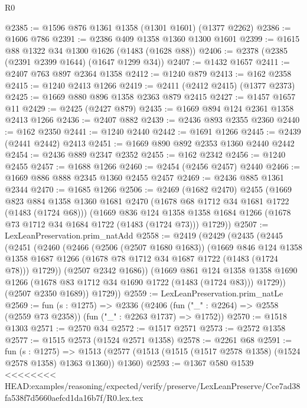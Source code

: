 \begin{lexlean}{R0}
\begin{coremodule}
{{{{{{{{{{{{{{{{{{{{{{{{{{{{{{{{{{{{{{{{{{{{{{{{{{{{{{{{{{{{{{{{{{{{{{{{{{{{{{{{{{{{{{@2385 := @1596 @876 @1361 @1358 (@1301 @1601) (@1377 @2262)
@2386 := @1606 @786
@2391 := @2386 @409 @1358 @1360 @1300 @1601
@2399 := @1615 @88 @1322 @34 @1300 @1626 (@1483 (@1628 @88))
@2406 := @2378 (@2385 (@2391 @2399 @1644) (@1647 @1299 @34))
@2407 := @1432 @1657
@2411 := @2407 @763 @897 @2364 @1358
@2412 := @1240 @879
@2413 := @162 @2358
@2415 := @1240 @2413 @1266
@2419 := @2411 (@2412 @2415) (@1377 @2373)
@2425 := @1669 @880 @896 @1358 @2363 @879 @2415
@2427 := @1457 @1657 @11
@2429 := @2425 (@2427 @879)
@2435 := @1669 @894 @124 @2361 @1358 @2413 @1266
@2436 := @2407 @882
@2439 := @2436 @893 @2355 @2360
@2440 := @162 @2350
@2441 := @1240 @2440
@2442 := @1691 @1266
@2445 := @2439 (@2441 @2442) @2413
@2451 := @1669 @890 @892 @2353 @1360 @2440 @2442
@2454 := @2436 @889 @2347 @2352
@2455 := @162 @2342
@2456 := @1240 @2455
@2457 := @1688 @1266
@2460 := @2454 (@2456 @2457) @2440
@2466 := @1669 @886 @888 @2345 @1360 @2455 @2457
@2469 := @2436 @885 @1361 @2344
@2470 := @1685 @1266
@2506 := @2469
    (@1682 @2470)
    @2455
    (@1669
      @823
      @884
      @1358
      @1360
      @1681
      @2470
      (@1678 @68 @1712 @34 @1681 @1722 (@1483 (@1724 @68)))
      (@1669
        @836
        @124
        @1358
        @1358
        @1684
        @1266
        (@1678 @73 @1712 @34 @1684 @1722 (@1483 (@1724 @73)))
        @1729))
@2507 := LexLeanPreservation.prim_natAdd
@2558 := @2419
    (@2429
      (@2435
        (@2445
          (@2451
            (@2460
              (@2466
                (@2506 (@2507 @1680 @1683))
                (@1669
                  @846
                  @124
                  @1358
                  @1358
                  @1687
                  @1266
                  (@1678 @78 @1712 @34 @1687 @1722 (@1483 (@1724 @78)))
                  @1729))
              (@2507 @2342 @1686))
            (@1669
              @861
              @124
              @1358
              @1358
              @1690
              @1266
              (@1678 @83 @1712 @34 @1690 @1722 (@1483 (@1724 @83)))
              @1729))
          (@2507 @2350 @1689))
        @1729))
@2559 := LexLeanPreservation.prim_natLe
@2569 := fun (s : @1275) =>
  @2336 (@2406 (fun ("_" : @2264) => @2558 (@2559 @73 @2358)) (fun ("_" : @2263 @1737) => @1752))
@2570 := @1518 @1303
@2571 := @2570 @34
@2572 := @1517 @2571
@2573 := @2572 @1358
@2577 := @1515 @2573 (@1524 @2571 @1358)
@2578 := @2261 @68
@2591 := fun (s : @1275) =>
  @1513 (@2577 (@1513 (@1515 (@1517 @2578 @1358) (@1524 @2578 @1358) @1363 @1360)) @1360)
@2593 := @1367 @580 @1539
<<<<<<<< HEAD:examples/reasoning/expected/verify/preserve/LexLeanPreserve/Cce7ad38fa538f7d5660aefcd1da16b7f/R0.lex.tex
}}}}}}}}}}}}}}}}}}}}}}}}}}}}}}}}}}}}}}}}}}}}}}}}}}}}}}}}}}}}}}}}}}}}}}}}}}}}}}}}}}}}}}
\end{coremodule}
\end{lexlean}
